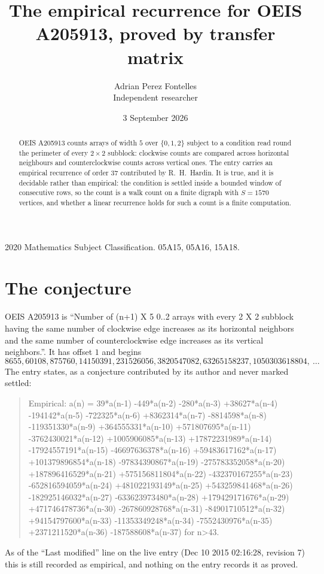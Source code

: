 \documentclass[11pt,a4paper]{article}
\title{The empirical recurrence for OEIS A205913, proved by transfer matrix}
\author{Adrian Perez Fontelles\\ \small Independent researcher}
\date{3 September 2026}
\theoremstyle{plain}
\theoremstyle{definition}
\begin{document}
\maketitle

\begin{abstract}
OEIS A205913 counts arrays of width $5$ over $\{0,1,2\}$ subject to a condition read round the
perimeter of every $2\times2$ subblock: clockwise counts are compared across horizontal neighbours and counterclockwise counts across vertical ones. The entry carries an empirical recurrence of
order $37$ contributed by R.~H.~Hardin. It is true, and it is decidable rather than
empirical: the condition is settled inside a bounded window of consecutive rows, so the
count is a walk count on a finite digraph with $S=1570$ vertices, and whether a linear
recurrence holds for such a count is a finite computation.
\end{abstract}

\noindent\small 2020 Mathematics Subject Classification. 05A15, 05A16, 15A18.\normalsize

\section{The conjecture}

OEIS A205913 is ``Number of (n+1) X 5 0..2 arrays with every 2 X 2 subblock having the same number of clockwise edge increases as its horizontal neighbors and the same number of counterclockwise edge increases as its vertical neighbors.''. It has offset $1$ and begins
\[
8655, 60108, 875760, 14150391, 231526056, 3820547082, 63265158237, 1050303618804,\ \dots
\]
The entry states, as a conjecture contributed by its author and never marked settled:
\begin{quote}
Empirical: a(n) = 39*a(n-1) -449*a(n-2) -280*a(n-3) +38627*a(n-4) -194142*a(n-5) -722325*a(n-6) +8362314*a(n-7) -8814598*a(n-8) -119351330*a(n-9) +364555331*a(n-10) +571807695*a(n-11) -3762430021*a(n-12) +1005906085*a(n-13) +17872231989*a(n-14) -17924557191*a(n-15) -46697636378*a(n-16) +59483617162*a(n-17) +101379896854*a(n-18) -97834390867*a(n-19) -275783352058*a(n-20) +187896416529*a(n-21) +575156811804*a(n-22) -432370167255*a(n-23) -652816594059*a(n-24) +481022193149*a(n-25) +543259841468*a(n-26) -182925146032*a(n-27) -633623973480*a(n-28) +179429171676*a(n-29) +471746478736*a(n-30) -267860928768*a(n-31) -84901710512*a(n-32) +94154797600*a(n-33) -11353349248*a(n-34) -7552430976*a(n-35) +2371211520*a(n-36) -187588608*a(n-37) for n>43.
\end{quote}
As of the ``Last modified'' line on the live entry (Dec 10 2015 02:16:28, revision 7) this is still
recorded as empirical, and nothing on the entry records it as proved.
\end{document}
